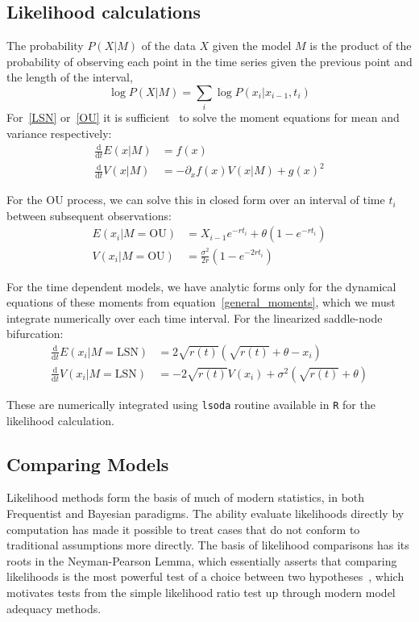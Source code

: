 \documentclass[authoryear,preprint,11pt]{elsarticle}
\newcommand{\ud}{\mathrm{d}}
\begin{document}
\subsection{Likelihood calculations}\label{likelihood}
The probability $P(X|M)$ of the data $X$ given the model $M$ is the product of the probability of observing each point in the time series given the previous point and the length of the interval,  
\begin{equation}
\log P(X | M)=  \sum_i \log P(x_i | x_{i-1}, t_i)
\end{equation}
For~\eqref{LSN} or~\eqref{OU} it is sufficient~\citep{Gardiner2009} to solve the moment equations for mean and variance respectively:
\begin{align}
 \frac{\ud }{\ud t} E(x| M)&=  f(x) \\
\frac{\ud}{\ud t} V(x| M) &=  -\partial_x f(x) V(x|M) + g(x)^2 
  \label{general_moments}
\end{align}

For the OU process, we can solve this in closed form over an interval of time $t_i$ between subsequent observations: 
\begin{align}
  E(x_i| M = \text{OU}) &= X_{i-1} e^{-r t_i} + \theta \left(1 - e^{-rt_i} \right) \\
V(x_i| M = \text{OU}) &= \frac{\sigma^2}{2 r} \left(1 - e^{-2 r t_i} \right)
\label{OUsoln}
\end{align}

For the time dependent models, we have analytic forms only for the dynamical equations of these moments from equation~\eqref{general_moments}, which we must integrate numerically over each time interval. For the linearized saddle-node bifurcation:
\begin{align}
\frac{\ud }{\ud t} E(x_i| M = \text{LSN})&=  2\sqrt{r(t)}(\sqrt{r(t)}+\theta - x_i) \\
\frac{\ud}{\ud t} V(x_i| M = \text{LSN}) &=  -2 \sqrt{r(t)} V(x_i) + \sigma^2 ( \sqrt{r(t)}+\theta )
\label{LSNsoln}
\end{align}

These are numerically integrated using \texttt{lsoda} routine available in \texttt{R} for the likelihood calculation.  

\subsection{Comparing Models}\label{Cox}
Likelihood methods form the basis of much of modern statistics, in both Frequentist and Bayesian paradigms.  
The ability evaluate likelihoods directly by computation has made it possible to treat cases that do not conform to traditional assumptions more directly.
The basis of likelihood comparisons has its roots in the Neyman-Pearson Lemma, 
which essentially asserts that comparing likelihoods is the most powerful test
of a choice between two hypotheses~\citep{Neyman1933}, which motivates
tests from the simple likelihood ratio test up through modern model adequacy methods.
\end{document}
